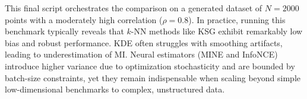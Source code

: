 This final script orchestrates the comparison on a generated dataset of $N=2000$ points with a moderately high correlation ($\rho=0.8$). In practice, running this benchmark typically reveals that $k$-NN methods like KSG exhibit remarkably low bias and robust performance. KDE often struggles with smoothing artifacts, leading to underestimation of MI. Neural estimators (MINE and InfoNCE) introduce higher variance due to optimization stochasticity and are bounded by batch-size constraints, yet they remain indispensable when scaling beyond simple low-dimensional benchmarks to complex, unstructured data.
